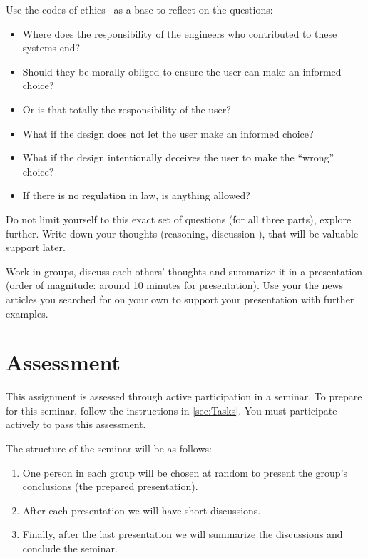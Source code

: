 \begin{frame}
Use the codes of ethics~\cite{acmcode,acmsecode,ieeecode} as a base to reflect 
on the questions:
\begin{itemize}
  \item Where does the responsibility of the engineers who contributed to these 
    systems end?
  \item Should they be morally obliged to ensure the user can make an informed 
    choice?
  \item Or is that totally the responsibility of the user?
  \item What if the design does not let the user make an informed choice?
  \item What if the design intentionally deceives the user to make the 
    \enquote{wrong} choice?
  \item If there is no regulation in law, is anything allowed?
\end{itemize}
\end{frame}

Do not limit yourself to this exact set of questions (for all three parts), 
explore further.
Write down your thoughts (reasoning, discussion \etc), that will be valuable 
support later.

Work in groups, discuss each others' thoughts and summarize it in a 
presentation (order of magnitude: around 10 minutes for presentation).
Use your the news articles you searched for on your own to support your 
presentation with further examples.


\section{Assessment}%
\label{Assessment}

This assignment is assessed through active participation in a seminar.
To prepare for this seminar, follow the instructions in \cref{sec:Tasks}.
You must participate actively to pass this assessment.

The structure of the seminar will be as follows:
\begin{frame}
  \begin{enumerate}
    \item One person in each group will be chosen at random to present the 
      group's conclusions (the prepared presentation).
    \item After each presentation we will have short discussions.
    \item Finally, after the last presentation we will summarize the 
      discussions and conclude the seminar.
  \end{enumerate}
\end{frame}



\begin{frame}[allowframebreaks]
  \printbibliography{}
\end{frame}
